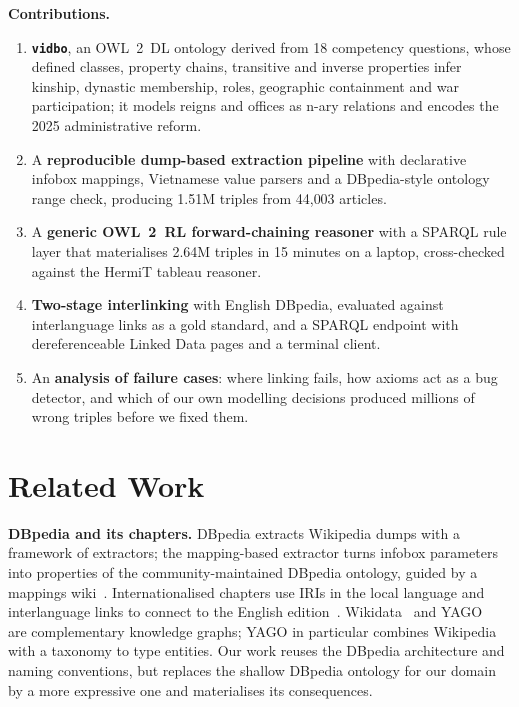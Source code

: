 \documentclass{article}
\newcommand{\ttl}[1]{\texttt{#1}}          %
\newcommand{\vidbo}{\ttl{vidbo}}
\begin{document}
\textbf{Contributions.}
\begin{enumerate}[leftmargin=*,itemsep=2pt]
  \item \textbf{\vidbo}, an OWL~2~DL ontology derived from 18 competency questions, whose defined classes, property
        chains, transitive and inverse properties infer kinship, dynastic membership, roles, geographic containment and
        war participation; it models reigns and offices as n-ary relations and encodes the 2025 administrative reform.
  \item A \textbf{reproducible dump-based extraction pipeline} with declarative infobox mappings, Vietnamese value
        parsers and a DBpedia-style ontology range check, producing 1.51M triples from 44{,}003 articles.
  \item A \textbf{generic OWL~2~RL forward-chaining reasoner} with a SPARQL rule layer that materialises 2.64M triples
        in 15 minutes on a laptop, cross-checked against the HermiT tableau reasoner.
  \item \textbf{Two-stage interlinking} with English DBpedia, evaluated against interlanguage links as a gold standard,
        and a SPARQL endpoint with dereferenceable Linked Data pages and a terminal client.
  \item An \textbf{analysis of failure cases}: where linking fails, how axioms act
        as a bug detector, and which of our own modelling decisions produced millions of wrong triples before we fixed them.
\end{enumerate}

\section{Related Work}

\textbf{DBpedia and its chapters.} DBpedia extracts Wikipedia dumps with a framework of extractors; the mapping-based
extractor turns infobox parameters into properties of the community-maintained DBpedia ontology, guided by a mappings
wiki~\cite{bizer2009dbpedia,lehmann2015dbpedia}. Internationalised chapters use IRIs in the local language and
interlanguage links to connect to the English edition~\cite{kontokostas2012greek}. Wikidata~\cite{vrandecic2014wikidata}
and YAGO~\cite{suchanek2007yago} are complementary knowledge graphs; YAGO in particular combines Wikipedia with a
taxonomy to type entities. Our work reuses the DBpedia architecture and naming conventions, but replaces the shallow
DBpedia ontology for our domain by a more expressive one and materialises its consequences.
\end{document}

